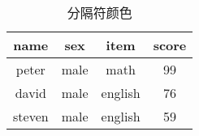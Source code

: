 \documentclass[UTF8,fontset=ubuntu]{ctexart}
\begin{document}
\begin{table}
\centering
{}
\begin{tabular}{|c|c|c||c|}
    \hline
    name & sex & item & score\\
    \hline
    peter & male & math & 99\\
    \hline
    david & male & english & 76\\
    \hline
    steven & male & english & 59\\
    \hline
\end{tabular}
\caption{分隔符颜色}
\end{table}
\end{document}
